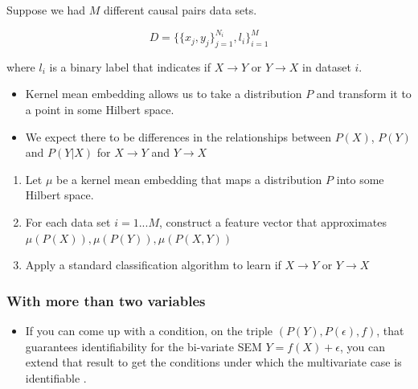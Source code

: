 \documentclass[b0,landscape,25pt]{sciposter}
\begin{document}
\begin{multicols}{5}
Suppose we had $M$ different causal pairs data sets. 

\begin{equation*}
D= \{\{x_{j},y_{j}\}_{j=1}^{N_{i}},l_{i}\}_{i=1}^{M}
\end{equation*}

where $l_{i}$ is a binary label that indicates if $X \rightarrow Y$ or $Y \rightarrow X$ in dataset $i$.

\begin{itemize}
\item Kernel mean embedding allows us to take a distribution $P$ and transform it to a point in some Hilbert space.
\item We expect there to be differences in the relationships between $P(X)$, $P(Y)$ and $P(Y|X)$ for $X \rightarrow Y$ and $Y \rightarrow X$
\end{itemize}
 
\begin{algorithm}
\caption{\label{alg:causallearn}}
\begin{enumerate}
\item Let $\mu$ be a kernel mean embedding that maps a distribution $P$ into some Hilbert space.
\item For each data set $i={1...M}$, construct a feature vector that approximates ${\mu(P(X)), \mu(P(Y)),\mu(P(X,Y)) }$
\item Apply a standard classification algorithm to learn if $X\rightarrow Y$ or $Y \rightarrow X$
\end{enumerate}
\end{algorithm}
\subsubsection*{With more than two variables}
\begin{itemize}
\item If you can come up with a condition, on the triple $(P(Y), P(\epsilon), f)$, that guarantees identifiability for the bi-variate SEM $Y = f(X) + \epsilon$, you can extend that result to get the conditions under which the multivariate case is identifiable \cite{Peters2014}.

\end{itemize}

\color{SaddleBrown} %




\color{DarkSlateGray} %





\end{multicols}
\end{document}
